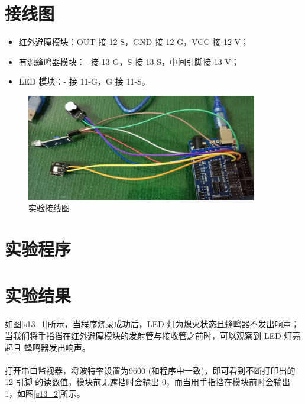 \documentclass[UTF8, oneside]{ctexbook}
\begin{document}
\section{接线图}
\begin{itemize}
    \item 红外避障模块：OUT 接 12-S，GND 接 12-G，VCC 接 12-V；
    \item 有源蜂鸣器模块：- 接 13-G，S 接 13-S，中间引脚接 13-V；
    \item LED 模块：- 接 11-G，G 接 11-S。
\end{itemize}
\begin{figure}[h]
    \centering
    \includegraphics[width=0.9\textwidth]{./result/sensor/13/lines2.jpg}
    \caption{实验接线图}
    \label{s13_line}
\end{figure}

\section{实验程序}


\section{实验结果}
\paragraph{}
如图\ref{s13_1}所示，当程序烧录成功后，LED 灯为熄灭状态且蜂鸣器不发出响声；
当我们将手指挡在红外避障模块的发射管与接收管之前时，可以观察到 LED 灯亮起且
蜂鸣器发出响声。

\paragraph{}
打开串口监视器，将波特率设置为9600 (和程序中一致)，即可看到不断打印出的 12 引脚
的读数值，模块前无遮挡时会输出 0，而当用手指挡在模块前时会输出 1，如图\ref{s13_2}所示。
\newpage
\end{document}
